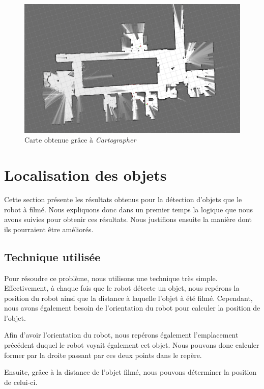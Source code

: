 \documentclass[10pt,a4paper]{article}
\begin{document}
   		\begin{figure}[h]
   			\begin{center}
   				\includegraphics[width=0.75\linewidth]{map}
   			\end{center}
   			\caption{Carte obtenue grâce à \textit{Cartographer}}
   			\label{fig:map}
   		\end{figure}
   
   	\section{Localisation des objets}
   	
   		Cette section présente les résultats obtenus pour la détection d'objets que le robot à filmé. Nous expliquons donc dans un premier temps la logique que nous avons suivies pour obtenir ces résultats. Nous justifions ensuite la manière dont ils pourraient être améliorés.
   		
   		\subsection{Technique utilisée}
   		
   			Pour résoudre ce problème, nous utilisons une technique très simple. Effectivement, à chaque fois que le robot détecte un objet, nous repérons la position du robot ainsi que la distance à laquelle l'objet à été filmé. Cependant, nous avons également besoin de l'orientation du robot pour calculer la position de l'objet.
   			
   			Afin d'avoir l'orientation du robot, nous repérons également l'emplacement précédent duquel le robot voyait également cet objet. Nous pouvons donc calculer former par la droite passant par ces deux points dans le repère.
   			
   			Ensuite, grâce à la distance de l'objet filmé, nous pouvons déterminer la position de celui-ci.\\
   			
\end{document}
